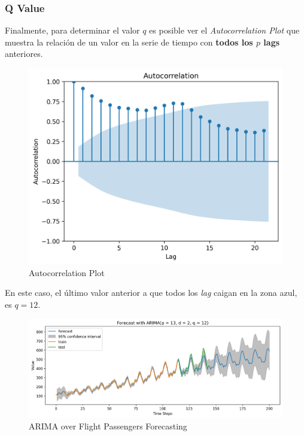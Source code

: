 \subsubsection{Q Value}
Finalmente, para determinar el valor $q$ es posible ver el \textit{Autocorrelation Plot} que muestra la relación de un valor en la serie de tiempo con \textbf{todos los $p$ lags} anteriores. 
\begin{figure}[H]
    \center
    \includegraphics[scale=0.5]{notebooks/ML/img/autocorrelation.png}
    \caption{Autocorrelation Plot}
\end{figure}
En este caso, el último valor anterior a que todos los \textit{lag} caigan en la zona azul, es $q=12$.
\begin{figure}[H]
    \center
    \includegraphics[scale=0.5]{notebooks/ML/img/arima_results.png}
    \caption{ARIMA over Flight Passengers Forecasting}
\end{figure}






